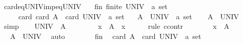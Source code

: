 \begin{isabellebody}
\isamarkupfalse%
%
\endisatagproof
{\isafoldproof}%
%
\isadelimproof
\isanewline
%
\endisadelimproof
\isanewline
{}\isamarkupfalse%
\ card{\isacharunderscore}{\kern0pt}eq{\isacharunderscore}{\kern0pt}UNIV{\isacharunderscore}{\kern0pt}imp{\isacharunderscore}{\kern0pt}eq{\isacharunderscore}{\kern0pt}UNIV{\isacharcolon}{\kern0pt}\isanewline
\ \ \ fin{\isacharcolon}{\kern0pt}\ {\isachardoublequoteopen}finite\ {\isacharparenleft}{\kern0pt}UNIV\ {\isacharcolon}{\kern0pt}{\isacharcolon}{\kern0pt}\ {\isacharprime}{\kern0pt}a\ set{\isacharparenright}{\kern0pt}{\isachardoublequoteclose}\isanewline
\ \ \ \ \ card{\isacharcolon}{\kern0pt}\ {\isachardoublequoteopen}card\ A\ {\isacharequal}{\kern0pt}\ card\ {\isacharparenleft}{\kern0pt}UNIV\ {\isacharcolon}{\kern0pt}{\isacharcolon}{\kern0pt}\ {\isacharprime}{\kern0pt}a\ set{\isacharparenright}{\kern0pt}{\isachardoublequoteclose}\isanewline
\ \ \ {\isachardoublequoteopen}A\ {\isacharequal}{\kern0pt}\ {\isacharparenleft}{\kern0pt}UNIV\ {\isacharcolon}{\kern0pt}{\isacharcolon}{\kern0pt}\ {\isacharprime}{\kern0pt}a\ set{\isacharparenright}{\kern0pt}{\isachardoublequoteclose}\isanewline
%
\isadelimproof
%
\endisadelimproof
%
\isatagproof
{}\isamarkupfalse%
\isanewline
\ \ \isamarkupfalse%
\ {\isachardoublequoteopen}A\ {\isasymsubseteq}\ UNIV{\isachardoublequoteclose}\ \isamarkupfalse%
\ simp\isanewline
\ \ \isamarkupfalse%
\ {\isachardoublequoteopen}UNIV\ {\isasymsubseteq}\ A{\isachardoublequoteclose}\isanewline
\ \ \isamarkupfalse%
\isanewline
\ \ \ \ \isamarkupfalse%
\ {\isachardoublequoteopen}x\ {\isasymin}\ A{\isachardoublequoteclose}\ \ x\isanewline
\ \ \ \ \isamarkupfalse%
\ {\isacharparenleft}{\kern0pt}rule\ ccontr{\isacharparenright}{\kern0pt}\isanewline
\ \ \ \ \ \ \isamarkupfalse%
\ {\isachardoublequoteopen}x\ {\isasymnotin}\ A{\isachardoublequoteclose}\isanewline
\ \ \ \ \ \ \isamarkupfalse%
\ \isamarkupfalse%
\ {\isachardoublequoteopen}A\ {\isasymsubset}\ UNIV{\isachardoublequoteclose}\ \isamarkupfalse%
\ auto\isanewline
\ \ \ \ \ \ \isamarkupfalse%
\ fin\ \isamarkupfalse%
\ {\isachardoublequoteopen}card\ A\ {\isacharless}{\kern0pt}\ card\ {\isacharparenleft}{\kern0pt}UNIV\ {\isacharcolon}{\kern0pt}{\isacharcolon}{\kern0pt}\ {\isacharprime}{\kern0pt}a\ set{\isacharparenright}{\kern0pt}{\isachardoublequoteclose}\isanewline

\end{isabellebody}
